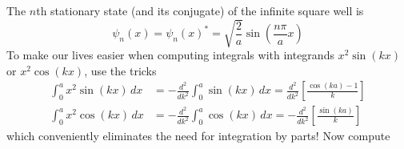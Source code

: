 \documentclass[a4paper]{article}
\begin{document}
The \( n \)th stationary state (and its conjugate) of the infinite square well is
\[
	\psi_{n}\!\left( x \right) = \psi_{n}\!\left( x \right)^{*} = \sqrt{\frac{2}{a}}\sin\!\left(\frac{n \pi}{a}x\right) 
\]
To make our lives easier when computing integrals with integrands \( x^{2}\sin\!\left(kx\right) \) or \( x^{2}\cos\!\left(kx\right) \), use the tricks
\begin{align*}
	\int^{a}_{0} x^{2}\sin\!\left(kx\right) \, dx & = -\frac{d^2 }{d k^2}\int^{a}_{0} \sin\!\left(kx\right) \, dx = \frac{d^2 }{d k^2}\!\left[ \frac{\cos\!\left(ka\right) - 1}{k} \right] \\
	\int^{a}_{0} x^{2}\cos\!\left(kx\right) \, dx & = -\frac{d^2 }{d k^2}\int^{a}_{0} \cos\!\left(kx\right) \, dx = -\frac{d^2 }{d k^2}\!\left[ \frac{\sin\!\left(ka\right)}{k} \right]  
\end{align*}
which conveniently eliminates the need for integration by parts! Now compute 
\end{document}
